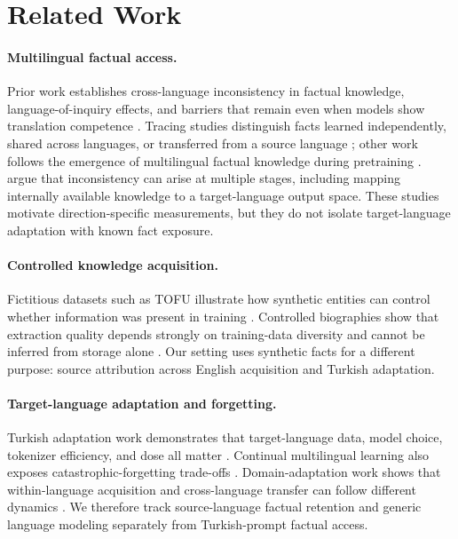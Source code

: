 \documentclass[10pt,a4paper,twocolumn]{article}
\begin{document}
\section{Related Work}

\paragraph{Multilingual factual access.}
Prior work establishes cross-language inconsistency in factual knowledge, language-of-inquiry effects, and barriers that remain even when models show translation competence \citep{qi2023crosslingual,schott2023polyglot,chua2025barriers,aggarwal2025inquiry}. Tracing studies distinguish facts learned independently, shared across languages, or transferred from a source language \citep{zhao2024roots}; other work follows the emergence of multilingual factual knowledge during pretraining \citep{liu2025acquisition}. \citet{wang2025lost} argue that inconsistency can arise at multiple stages, including mapping internally available knowledge to a target-language output space. These studies motivate direction-specific measurements, but they do not isolate target-language adaptation with known fact exposure.

\paragraph{Controlled knowledge acquisition.}
Fictitious datasets such as TOFU illustrate how synthetic entities can control whether information was present in training \citep{maini2024tofu}. Controlled biographies show that extraction quality depends strongly on training-data diversity and cannot be inferred from storage alone \citep{allenzhu2023storage}. Our setting uses synthetic facts for a different purpose: source attribution across English acquisition and Turkish adaptation.

\paragraph{Target-language adaptation and forgetting.}
Turkish adaptation work demonstrates that target-language data, model choice, tokenizer efficiency, and dose all matter \citep{acikgoz2024bosphorus}. Continual multilingual learning also exposes catastrophic-forgetting trade-offs \citep{winata2023forgetting,yamaguchi2026shielded}. Domain-adaptation work shows that within-language acquisition and cross-language transfer can follow different dynamics \citep{zhao2026dynamics}. We therefore track source-language factual retention and generic language modeling separately from Turkish-prompt factual access.
\end{document}
